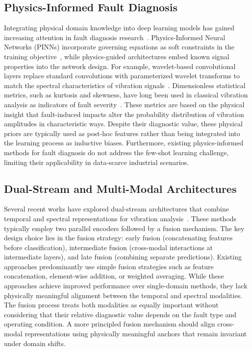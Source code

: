 \subsection{Physics-Informed Fault Diagnosis}

Integrating physical domain knowledge into deep learning models has gained increasing attention in fault diagnosis research~\cite{wang2020physics}. Physics-Informed Neural Networks (PINNs) incorporate governing equations as soft constraints in the training objective~\cite{raissi2019physics}, while physics-guided architectures embed known signal properties into the network design. For example, wavelet-based convolutional layers replace standard convolutions with parameterized wavelet transforms to match the spectral characteristics of vibration signals~\cite{shen2023physics}. Dimensionless statistical metrics, such as kurtosis and skewness, have long been used in classical vibration analysis as indicators of fault severity~\cite{heng2009rotating}. These metrics are based on the physical insight that fault-induced impacts alter the probability distribution of vibration amplitudes in characteristic ways. Despite their diagnostic value, these physical priors are typically used as post-hoc features rather than being integrated into the learning process as inductive biases. Furthermore, existing physics-informed methods for fault diagnosis do not address the few-shot learning challenge, limiting their applicability in data-scarce industrial scenarios.

\subsection{Dual-Stream and Multi-Modal Architectures}

Several recent works have explored dual-stream architectures that combine temporal and spectral representations for vibration analysis~\cite{zhao2021fdfnet,han2022mcformer}. These methods typically employ two parallel encoders followed by a fusion mechanism. The key design choice lies in the fusion strategy: early fusion (concatenating features before classification), intermediate fusion (cross-modal interactions at intermediate layers), and late fusion (combining separate predictions). Existing approaches predominantly use simple fusion strategies such as feature concatenation, element-wise addition, or weighted averaging. While these approaches achieve improved performance over single-domain methods, they lack physically meaningful alignment between the temporal and spectral modalities. The fusion process treats both modalities as equally important without considering that their relative diagnostic value depends on the fault type and operating condition. A more principled fusion mechanism should align cross-modal representations using physically meaningful anchors that remain invariant under domain shifts.
